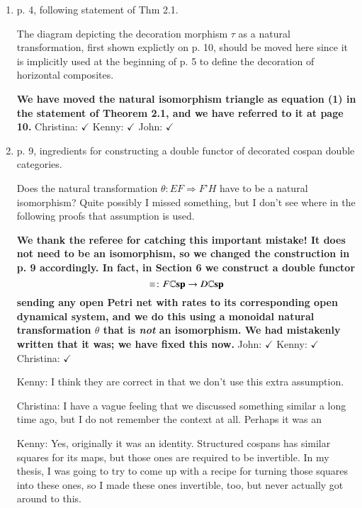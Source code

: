 \documentclass[reqno]{amsart}
\newcommand*{\graysquare}{\textcolor{lightgray}{\blacksquare}}
\newcommand{\double}[1]{\mathbf{\mathbb #1}}
\newcommand{\lCsp}{\double{Csp}}
\def\chris{\color{purple} Christina: }
\def\john{\color{red} John: }
\def\kenny{\color{blue} Kenny: }
\begin{document}
\begin{enumerate}
{And yeah, Kenny, it's annoying: people complain if you repeat already known stuff, but they also complain if you don't.}

\fi

\item p. 4, following statement of Thm 2.1.

The diagram depicting the decoration morphism $\tau$ as a natural transformation, first shown explictly on p. 10, should be moved here since it is 
implicitly used at the beginning of p. 5 to define the decoration of horizontal composites.

{\bf We have moved the natural isomorphism triangle as equation (1) in the statement of Theorem 2.1, and we have referred to it at page 10.} {\chris 
$\checkmark$} {\kenny $\checkmark$} {\john $\checkmark$} 

\item p. 9, ingredients for constructing a double functor of decorated cospan double categories.

Does the natural transformation $\theta \colon EF \Rightarrow F’ H$ have to be a natural isomorphism? Quite possibly I missed something, but I don’t see where in 
the following proofs that assumption is used.

{\bf We thank the referee for catching this important mistake!   It does not need to be an isomorphism, so we changed the construction in p. 
9 accordingly. In fact, in Section 6 we construct a double functor
\[      \graysquare \colon F \lCsp \to D \lCsp \]
sending any open Petri net with rates to its corresponding open dynamical system, and we do this
using a monoidal natural transformation $\theta$ that is \emph{not} an isomorphism.  We had mistakenly written that it was; we have fixed this now.}
{\john $\checkmark$} {\kenny $\checkmark$} {\chris $\checkmark$}

\iffalse
{\kenny I think they are correct in that we don't use this extra assumption.}

{\chris I have a vague feeling that we discussed something similar a long time ago, but I do not remember the context at all. Perhaps it was an 

{\kenny Yes, originally it was an identity. Structured cospans has similar squares for its maps, but those ones are required to be invertible. In my 
thesis, I was going to try to come up with a recipe for turning those squares into these ones, so I made these ones invertible, too, but never 
actually got around to this.}

}
\end{enumerate}
\end{document}
